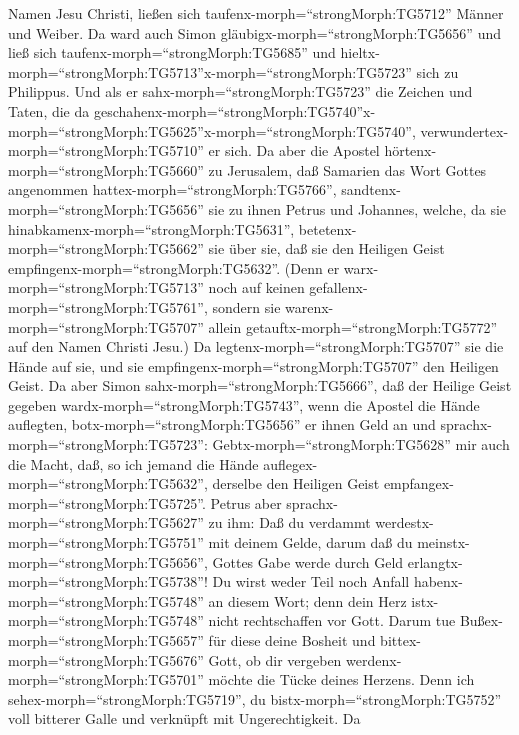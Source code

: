 Namen Jesu Christi, ließen sich taufenx-morph=``strongMorph:TG5712''
Männer und Weiber.  Da ward auch Simon
gläubigx-morph=``strongMorph:TG5656'' und ließ sich
taufenx-morph=``strongMorph:TG5685'' und
hieltx-morph=``strongMorph:TG5713''x-morph=``strongMorph:TG5723'' sich
zu Philippus. Und als er sahx-morph=``strongMorph:TG5723'' die Zeichen
und Taten, die da
geschahenx-morph=``strongMorph:TG5740''\textbar x-morph=``strongMorph:TG5625''x-morph=``strongMorph:TG5740'',
verwundertex-morph=``strongMorph:TG5710'' er sich.  Da aber
die Apostel hörtenx-morph=``strongMorph:TG5660'' zu Jerusalem, daß
Samarien das Wort Gottes angenommen hattex-morph=``strongMorph:TG5766'',
sandtenx-morph=``strongMorph:TG5656'' sie zu ihnen Petrus und Johannes,
 welche, da sie hinabkamenx-morph=``strongMorph:TG5631'',
betetenx-morph=``strongMorph:TG5662'' sie über sie, daß sie den Heiligen
Geist empfingenx-morph=``strongMorph:TG5632''.  (Denn er
warx-morph=``strongMorph:TG5713'' noch auf keinen
gefallenx-morph=``strongMorph:TG5761'', sondern sie
warenx-morph=``strongMorph:TG5707'' allein
getauftx-morph=``strongMorph:TG5772'' auf den Namen Christi Jesu.)
 Da legtenx-morph=``strongMorph:TG5707'' sie die Hände auf
sie, und sie empfingenx-morph=``strongMorph:TG5707'' den Heiligen Geist.
 Da aber Simon sahx-morph=``strongMorph:TG5666'', daß der
Heilige Geist gegeben wardx-morph=``strongMorph:TG5743'', wenn die
Apostel die Hände auflegten, botx-morph=``strongMorph:TG5656'' er ihnen
Geld an  und sprachx-morph=``strongMorph:TG5723'':
Gebtx-morph=``strongMorph:TG5628'' mir auch die Macht, daß, so ich
jemand die Hände auflegex-morph=``strongMorph:TG5632'', derselbe den
Heiligen Geist empfangex-morph=``strongMorph:TG5725''. 
Petrus aber sprachx-morph=``strongMorph:TG5627'' zu ihm: Daß du verdammt
werdestx-morph=``strongMorph:TG5751'' mit deinem Gelde, darum daß du
meinstx-morph=``strongMorph:TG5656'', Gottes Gabe werde durch Geld
erlangtx-morph=``strongMorph:TG5738''!  Du wirst weder Teil
noch Anfall habenx-morph=``strongMorph:TG5748'' an diesem Wort; denn
dein Herz istx-morph=``strongMorph:TG5748'' nicht rechtschaffen vor
Gott.  Darum tue Bußex-morph=``strongMorph:TG5657'' für
diese deine Bosheit und bittex-morph=``strongMorph:TG5676'' Gott, ob dir
vergeben werdenx-morph=``strongMorph:TG5701'' möchte die Tücke deines
Herzens.  Denn ich sehex-morph=``strongMorph:TG5719'', du
bistx-morph=``strongMorph:TG5752'' voll bitterer Galle und verknüpft mit
Ungerechtigkeit.  Da
